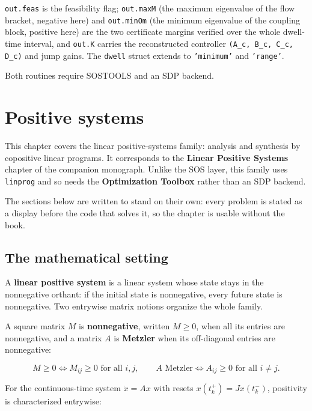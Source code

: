 \documentclass[11pt,oneside]{report}
\newcommand{\code}[1]{\texttt{#1}}
\begin{document}
\code{out.feas} is the feasibility flag; \code{out.maxM} (the maximum eigenvalue of the
flow bracket, negative here) and \code{out.minOm} (the minimum eigenvalue of the
coupling block, positive here) are the two certificate margins verified over the
whole dwell-time interval, and \code{out.K} carries the reconstructed controller
\code{(A\_c, B\_c, C\_c, D\_c)} and jump gains. The \code{dwell} struct extends to \code{'minimum'}
and \code{'range'}.

Both routines require SOSTOOLS and an SDP backend.


\hypertarget{chap:10-positive-systems}{%
\chapter{Positive systems}\label{chap:10-positive-systems}}

This chapter covers the linear positive-systems family: analysis and synthesis
by copositive linear programs. It corresponds to the \textbf{Linear Positive Systems}
chapter of the companion monograph. Unlike the SOS layer, this family uses
\code{linprog} and so needs the \textbf{Optimization Toolbox} rather than an SDP backend.

The sections below are written to stand on their own: every problem is stated as
a display before the code that solves it, so the chapter is usable without the
book.

\hypertarget{the-mathematical-setting}{%
\section{The mathematical setting}\label{the-mathematical-setting}}

A \textbf{linear positive system} is a linear system whose state stays in the
nonnegative orthant: if the initial state is nonnegative, every future state is
nonnegative. Two entrywise matrix notions organize the whole family.

A square matrix \(M\) is \textbf{nonnegative}, written \(M \ge 0\), when all its entries
are nonnegative, and a matrix \(A\) is \textbf{Metzler} when its off-diagonal entries
are nonnegative:

\[
M \ge 0 \iff M_{ij} \ge 0 \text{ for all } i,j,
\qquad
A \text{ Metzler} \iff A_{ij} \ge 0 \text{ for all } i \ne j .
\]

For the continuous-time system \(\dot x = A x\) with resets \(x(t_k^+) = J x(t_k^-)\),
positivity is characterized entrywise:
\end{document}
